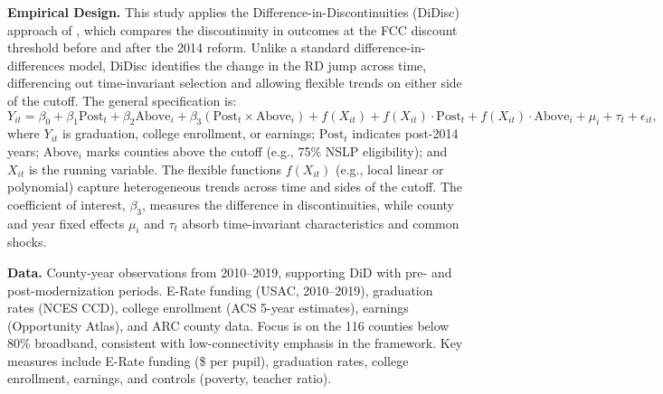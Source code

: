 \textbf{Empirical Design.} This study applies the Difference-in-Discontinuities (DiDisc) approach of \citet{grembiFiscalRulesMatter2016}, which compares the discontinuity in outcomes at the FCC discount threshold before and after the 2014 reform. Unlike a standard difference-in-differences model, DiDisc identifies the change in the RD jump across time, differencing out time-invariant selection and allowing flexible trends on either side of the cutoff. The general specification is:
\[
Y_{it} = \beta_0 + \beta_1 \text{Post}_t + \beta_2 \text{Above}_i + \beta_3 (\text{Post}_t \times \text{Above}_i) 
+ f(X_{it}) + f(X_{it}) \cdot \text{Post}_t + f(X_{it}) \cdot \text{Above}_i 
+ \mu_i + \tau_t + \epsilon_{it},
\]
where $Y_{it}$ is graduation, college enrollment, or earnings; $\text{Post}_t$ indicates post-2014 years; $\text{Above}_i$ marks counties above the cutoff (e.g., 75\% NSLP eligibility); and $X_{it}$ is the running variable. The flexible functions $f(X_{it})$ (e.g., local linear or polynomial) capture heterogeneous trends across time and sides of the cutoff. The coefficient of interest, $\beta_3$, measures the difference in discontinuities, while county and year fixed effects $\mu_i$ and $\tau_t$ absorb time-invariant characteristics and common shocks. 

\textbf{Data.} County-year observations from 2010–2019, supporting DiD with pre- and post-modernization periods. E-Rate funding (USAC, 2010–2019), graduation rates (NCES CCD), college enrollment (ACS 5-year estimates), earnings (Opportunity Atlas), and ARC county data. Focus is on the 116 counties below 80\% broadband, consistent with low-connectivity emphasis in the framework. Key measures include E-Rate funding (\$ per pupil), graduation rates, college enrollment, earnings, and controls (poverty, teacher ratio).







